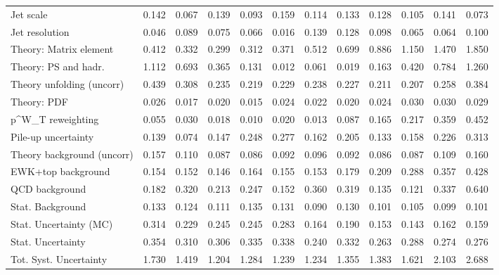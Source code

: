 \begin{tabular}{l|p{0.6cm}p{0.6cm}p{0.6cm}p{0.6cm}p{0.6cm}p{0.6cm}p{0.6cm}p{0.6cm}p{0.6cm}p{0.6cm}p{0.6cm}}
Jet scale                                & 0.142 & 0.067 & 0.139 & 0.093 & 0.159 & 0.114 & 0.133 & 0.128 & 0.105 & 0.141 & 0.073 \\
Jet resolution                           & 0.046 & 0.089 & 0.075 & 0.066 & 0.016 & 0.139 & 0.128 & 0.098 & 0.065 & 0.064 & 0.100 \\
Theory: Matrix element                   & 0.412 & 0.332 & 0.299 & 0.312 & 0.371 & 0.512 & 0.699 & 0.886 & 1.150 & 1.470 & 1.850 \\
Theory: PS and hadr.                     & 1.112 & 0.693 & 0.365 & 0.131 & 0.012 & 0.061 & 0.019 & 0.163 & 0.420 & 0.784 & 1.260 \\
Theory unfolding (uncorr)                & 0.439 & 0.308 & 0.235 & 0.219 & 0.229 & 0.238 & 0.227 & 0.211 & 0.207 & 0.258 & 0.384 \\
Theory: PDF                              & 0.026 & 0.017 & 0.020 & 0.015 & 0.024 & 0.022 & 0.020 & 0.024 & 0.030 & 0.030 & 0.029 \\
p^{W}_{T} reweighting                    & 0.055 & 0.030 & 0.018 & 0.010 & 0.020 & 0.013 & 0.087 & 0.165 & 0.217 & 0.359 & 0.452 \\
Pile-up uncertainty                      & 0.139 & 0.074 & 0.147 & 0.248 & 0.277 & 0.162 & 0.205 & 0.133 & 0.158 & 0.226 & 0.313 \\
Theory background (uncorr)               & 0.157 & 0.110 & 0.087 & 0.086 & 0.092 & 0.096 & 0.092 & 0.086 & 0.087 & 0.109 & 0.160 \\
EWK+top background                       & 0.154 & 0.152 & 0.146 & 0.164 & 0.155 & 0.153 & 0.179 & 0.209 & 0.288 & 0.357 & 0.428 \\
QCD background                           & 0.182 & 0.320 & 0.213 & 0.247 & 0.152 & 0.360 & 0.319 & 0.135 & 0.121 & 0.337 & 0.640 \\
Stat. Background                         & 0.133 & 0.124 & 0.111 & 0.135 & 0.131 & 0.090 & 0.130 & 0.101 & 0.105 & 0.099 & 0.101 \\
Stat. Uncertainty (MC)                   & 0.314 & 0.229 & 0.245 & 0.245 & 0.283 & 0.164 & 0.190 & 0.153 & 0.143 & 0.162 & 0.159 \\
\hline
Stat. Uncertainty                        & 0.354 & 0.310 & 0.306 & 0.335 & 0.338 & 0.240 & 0.332 & 0.263 & 0.288 & 0.274 & 0.276 \\
\hline
Tot. Syst. Uncertainty                   & 1.730 & 1.419 & 1.204 & 1.284 & 1.239 & 1.234 & 1.355 & 1.383 & 1.621 & 2.103 & 2.688 \\
\hline
\end{tabular}
